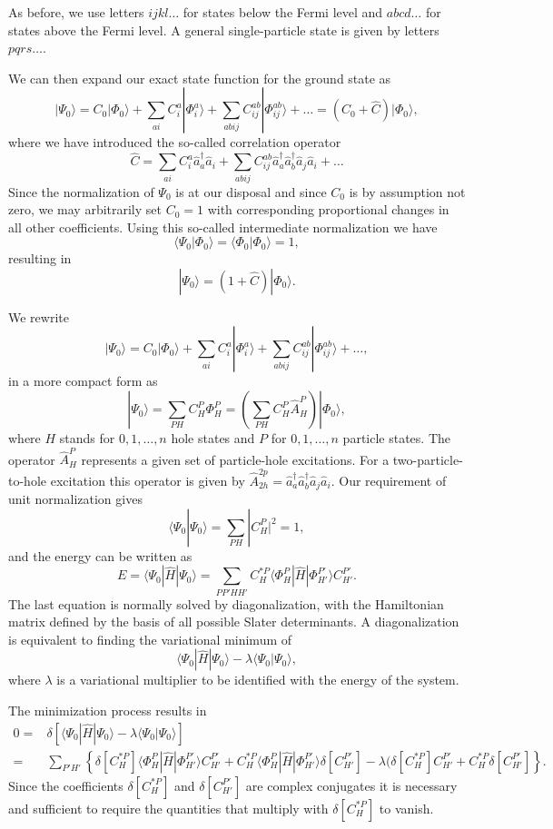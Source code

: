   As before, we use letters $ijkl\dots$ for states below the Fermi level and
  $abcd\dots$ for states above the Fermi level. A general
  single-particle state is given by letters $pqrs\dots$.

  We can then expand our exact state function for the ground state as
  \[
  |\Psi_0\rangle=C_0|\Phi_0\rangle+\sum_{ai}C_i^a|\Phi_i^a\rangle+\sum_{abij}C_{ij}^{ab}|\Phi_{ij}^{ab}\rangle+\dots
  =(C_0+\hat{C})|\Phi_0\rangle,
  \]
  where we have introduced the so-called correlation operator
  \[
  \hat{C}=\sum_{ai}C_i^a\hat{a}_{a}^{\dagger}\hat{a}_i
  +\sum_{abij}C_{ij}^{ab}\hat{a}_{a}^{\dagger}\hat{a}_{b}^{\dagger}\hat{a}_j\hat{a}_i+\dots
  \]
  Since the normalization of $\Psi_0$ is at our disposal and since
  $C_0$ is by assumption not zero, we may arbitrarily set $C_0=1$ with
  corresponding proportional changes in all other coefficients. Using
  this so-called intermediate normalization we have
  \[
  \langle \Psi_0 | \Phi_0 \rangle = \langle \Phi_0 | \Phi_0 \rangle =
  1,
  \]
  resulting in
  \[
  |\Psi_0\rangle=(1+\hat{C})|\Phi_0\rangle.
  \]


  We rewrite
  \[
  |\Psi_0\rangle=C_0|\Phi_0\rangle+\sum_{ai}C_i^a|\Phi_i^a\rangle+\sum_{abij}C_{ij}^{ab}|\Phi_{ij}^{ab}\rangle+\dots,
  \]
  in a more compact form as
  \[
  |\Psi_0\rangle=\sum_{PH}C_H^P\Phi_H^P=\left(\sum_{PH}C_H^P\hat{A}_H^P\right)|\Phi_0\rangle,
  \]
  where $H$ stands for $0,1,\dots,n$ hole states and $P$ for
  $0,1,\dots,n$ particle states. The operator $\hat{A}_H^P$ represents
  a given set of particle-hole excitations. For a two-particle-to-hole
  excitation this operator is given by
  $\hat{A}_{2h}^{2p}=\hat{a}_{a}^{\dagger}\hat{a}_{b}^{\dagger}\hat{a}_j\hat{a}_i$.
  Our requirement of unit normalization gives
  \[
  \langle \Psi_0 | \Psi_0 \rangle = \sum_{PH}|C_H^P|^2= 1,
  \]
  and the energy can be written as
  \[
  E= \langle \Psi_0 | \hat{H} |\Psi_0 \rangle=
  \sum_{PP'HH'}C_H^{*P}\langle \Phi_H^P | \hat{H} |\Phi_{H'}^{P'}
  \rangle C_{H'}^{P'}.
  \]
  The last equation is normally solved by diagonalization, with the
  Hamiltonian matrix defined by the basis of all possible Slater
  determinants. A diagonalization is equivalent to finding the
  variational minimum of
  \[
   \langle \Psi_0 | \hat{H} |\Psi_0 \rangle-\lambda \langle \Psi_0
   |\Psi_0 \rangle,
  \]
  where $\lambda$ is a variational multiplier to be identified with
  the energy of the system.

  The minimization process results in
  \begin{align}
  0=&\delta\left[ \langle \Psi_0 | \hat{H} |\Psi_0 \rangle-\lambda
    \langle \Psi_0 |\Psi_0 \rangle\right]\\
  =& \sum_{P'H'}\left\{\delta[C_H^{*P}]\langle \Phi_H^P | \hat{H}
  |\Phi_{H'}^{P'} \rangle C_{H'}^{P'}+ C_H^{*P}\langle \Phi_H^P |
  \hat{H} |\Phi_{H'}^{P'} \rangle \delta[C_{H'}^{P'}]- \lambda(
  \delta[C_H^{*P}]C_{H'}^{P'}+C_H^{*P}\delta[C_{H'}^{P'}]\right\}.
  \end{align}
  Since the coefficients $\delta[C_H^{*P}]$ and $\delta[C_{H'}^{P'}]$
  are complex conjugates it is necessary and sufficient to require the
  quantities that multiply with $\delta[C_H^{*P}]$ to vanish.

